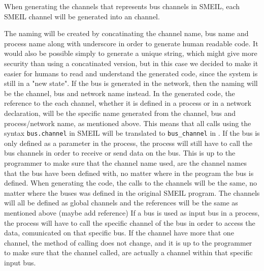 When generating the channels that represents bus channels in SMEIL, each SMEIL channel will be generated into an \cspm channel.

The naming will be created by concatinating the channel name, bus name and process name along with underscore in order to generate human readable code. It would also be possible simply to generate a unique string, which might give more security than using a concatinated version, but in this case we decided to make it easier for humans to read and understand the generated code, since the system is still in a "new state".
If the bus is generated in the network, then the naming will be the channel, bus and network name instead.
In the generated \cspm code, the reference to the each channel, whether it is defined in a process or in a network declaration, will be the specific name generated from the channel, bus and process/network name, as mentioned above. This means that all calls using the syntax \texttt{bus.channel} in SMEIL will be translated to \texttt{bus\_channel} in \cspm.
If the bus is only defined as a parameter in the process, the process will still have to call the bus channels in order to receive or send data on the bus. This is up to the programmer to make sure that the channel name used, are the channel names that the bus have been defined with, no matter where in the program the bus is defined. When generating the \cspm code, the calls to the channels will be the same, no matter where the buses was defined in the original SMEIL program. The channels will all be defined as global channels and the references will be the same as mentioned above (maybe add reference)
If a bus is used as input bus in a process, the process will have to call the specific channel of the bus in order to access the data, comunicated on that specific bus. If the channel have more that one channel, the method of calling does not change, and it is up to the programmer to make sure that the channel called, are actually a channel within that specific input bus.




